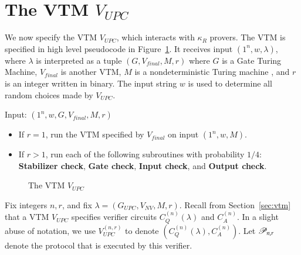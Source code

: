
\section{The VTM $V_{UPC}$}
\label{sec:vtm_upc}

We now specify the VTM $V_{UPC}$, which interacts with $\kappa_R$ provers. The VTM is specified in high level pseudocode in Figure~\ref{fig:vtm}. It receives input $(1^n,w,\lambda)$, where $\lambda$ is interpreted as a tuple $(G,V_{final},M,r)$ where $G$ is a Gate Turing Machine, $V_{final}$ is another VTM, $M$ is a nondeterministic Turing machine , and $r$ is an integer written in binary. The input string $w$ is used to determine all random choices made by $V_{UPC}$.

\begin{center}
\begin{mdframed}
    Input: $(1^n,w,G,V_{final},M,r)$
    \begin{itemize}
    	\item If $r = 1$, run the VTM specified by $V_{final}$ on input $(1^n,w,M)$.
	
		\item If $r > 1$, run each of the following subroutines with probability $1/4$: \textbf{Stabilizer check}, \textbf{Gate check}, \textbf{Input check}, and \textbf{Output check}.
		\end{itemize}
\end{mdframed}

\begin{figure}[H]
\caption{The VTM $V_{UPC}$}
\label{fig:vtm}
\end{figure}
\end{center}

Fix integers $n, r$, and fix $\lambda = (G_{UPC},V_{NV},M,r)$. Recall from Section~\ref{sec:vtm} that a VTM $V_{UPC}$ specifies verifier circuits $C_Q^{(n)}(\lambda)$ and $C_A^{(n)}$. In a slight abuse of notation, we use $V_{UPC}^{(n,r)}$ to denote $(C_Q^{(n)}(\lambda),C_A^{(n)})$. Let $\mathscr{P}_{n,r}$ denote the protocol that is executed by this verifier. 


